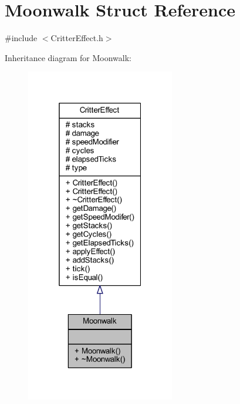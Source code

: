 \hypertarget{struct_moonwalk}{\section{Moonwalk Struct Reference}
\label{struct_moonwalk}
}


{\ttfamily \#include $<$Critter\+Effect.\+h$>$}



Inheritance diagram for Moonwalk\+:
\nopagebreak
\begin{figure}[H]
\begin{center}
\leavevmode
\includegraphics[width=184pt]{struct_moonwalk__inherit__graph}
\end{center}
\end{figure}



